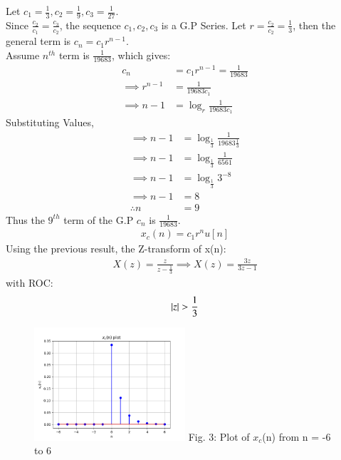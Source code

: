 \documentclass[journal,12pt,twocolumn]{IEEEtran}
\theoremstyle{remark}
\begin{document}
Let $c_1 = \frac{1}{3}, c_2 = \frac{1}{9}, c_3 = \frac{1}{27}$.\\
Since $\frac{c_2}{c_1} = \frac{c_3}{c_2}$, the sequence $c_1, c_2, c_3$ is a G.P Series.
Let $r = \frac{c_2}{c_2} = \frac{1}{3}$, then the general term is $c_n = c_1 r^{n-1}$.\\
Assume $n^{th}$ term is $\frac{1}{19683}$, which gives: 
\begin{align}
    c_n &= c_1 r^{n-1} = \frac{1}{19683}\\
    \implies r^{n-1} &= \frac{1}{19683 c_1}\\
    \implies n - 1 &= \log_{r}{\frac{1}{19683 c_1}}
\end{align}
Substituting Values,
\begin{align}
    \implies n - 1 &= \log_{\frac{1}{3}}{\frac{1}{19683 \frac{1}{3}}}\\
    \implies n - 1 &= \log_{\frac{1}{3}}{\frac{1}{6561}}\\
    \implies n - 1 &= \log_{\frac{1}{3}}{3^{-8}}\\
    \implies n - 1 &= 8\\
    \therefore n &= 9
\end{align}
Thus the $9^{th}$ term of the G.P $c_n$ is $\frac{1}{19683}$.
\begin{align}  x_c(n) = c_1r^{n}u[n]  \end{align}
Using the previous result, the Z-transform of x(n):
\begin{align}
    X(z) = \frac{z}{z - \frac{1}{3}}
    \implies X(z) = \frac{3z}{3z - 1}
\end{align} with ROC: \[ \left\vert z\right\vert > \frac{1}{3} \]

\begin{figure}[h!]
    \centering
    \includegraphics[width=0.5\textwidth]{figs/c.png}
    Fig. 3: Plot of $x_c$(n) from n = -6 to 6
    \label{fig:img3}
\end{figure}
\end{document}

